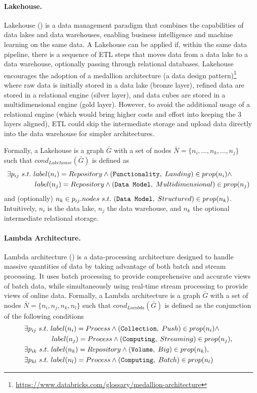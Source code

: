 \paragraph{Lakehouse.} Lakehouse () is a data management paradigm that combines the capabilities of data lakes and data warehouses, enabling business intelligence and machine learning on the same data. A Lakehouse can be applied if, within the same data pipeline, there is a sequence of ETL steps that moves data from a data lake to a data warehouse, optionally passing through relational databases. Lakehouse encourages the adoption of a medallion architecture (a data design pattern)\footnote{\url{https://www.databricks.com/glossary/medallion-architecture}} where raw data is initially stored in a data lake (bronze layer), refined data are stored in a relational engine (silver layer), and data cubes are stored in a multidimensional engine (gold layer). However, to avoid the additional usage of a relational engine (which would bring higher costs and effort into keeping the 3 layers aligned), ETL could skip the intermediate storage and upload data directly into the data warehouse for simpler architectures.

Formally, a Lakehouse is a graph $\bar{G}$ with a set of nodes $\bar{N}=\{n_i, ..., n_k, ..., n_j\}$ such that $cond_{Lakehouse}(\bar{G})$ is defined as
\begin{align*}
&\exists p_{ij} ~ s.t. ~ label(n_i) = Repository \wedge (\texttt{Functionality},\;Landing) \in prop(n_i) \wedge\\
&\qquad\qquad            label(n_j) = Repository \wedge (\texttt{Data Model},\;Multidimensional) \in prop(n_j)
\end{align*}
and (optionally) $n_k \in p_{ij}.nodes ~ s.t. ~ (\texttt{Data Model},\;Structured) \in prop(n_k)$. Intuitively, $n_i$ is the data lake, $n_j$ the data warehouse, and $n_k$ the optional intermediate relational storage.

\paragraph{Lambda Architecture.} Lambda architecture () is a data-processing architecture designed to handle massive quantities of data by taking advantage of both batch and stream processing. It uses batch processing to provide comprehensive and accurate views of batch data, while simultaneously using real-time stream processing to provide views of online data. Formally, a Lambda architecture is a graph $\bar{G}$ with a set of nodes $\bar{N}=\{n_i, n_j, n_k, n_l\}$ such that $cond_{Lambda}(\bar{G})$ is defined as the conjunction of the following conditions
\begin{align*}
&\exists p_{ij} ~ s.t. ~ label(n_i) = Process \wedge (\texttt{Collection},\;Push) \in prop(n_i) \wedge\\
&\qquad\qquad label(n_j) = Process \wedge (\texttt{Computing},\;Streaming) \in prop(n_j),\\
&\exists p_{ik} ~ s.t. ~ label(n_k) = Repository \wedge (\texttt{Volume},\;Big) \in prop(n_k),\\
&\exists p_{kl} ~ s.t. ~ label(n_l) = Process \wedge (\texttt{Computing},\;Batch) \in prop(n_l)
\end{align*}


